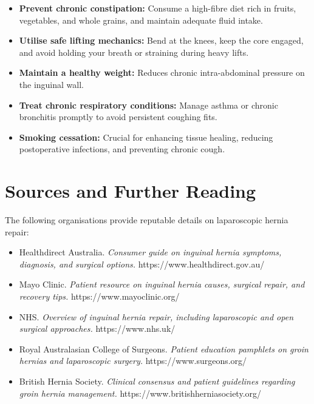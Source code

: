 \begin{itemize}
    \item \textbf{Prevent chronic constipation:} Consume a high-fibre diet rich in fruits, vegetables, and whole grains, and maintain adequate fluid intake.
    \item \textbf{Utilise safe lifting mechanics:} Bend at the knees, keep the core engaged, and avoid holding your breath or straining during heavy lifts.
    \item \textbf{Maintain a healthy weight:} Reduces chronic intra-abdominal pressure on the inguinal wall.
    \item \textbf{Treat chronic respiratory conditions:} Manage asthma or chronic bronchitis promptly to avoid persistent coughing fits.
    \item \textbf{Smoking cessation:} Crucial for enhancing tissue healing, reducing postoperative infections, and preventing chronic cough.
\end{itemize}

\section*{Sources and Further Reading}
The following organisations provide reputable details on laparoscopic hernia repair:

\begin{itemize}
    \item Healthdirect Australia. \textit{Consumer guide on inguinal hernia symptoms, diagnosis, and surgical options.} https://www.healthdirect.gov.au/
    \item Mayo Clinic. \textit{Patient resource on inguinal hernia causes, surgical repair, and recovery tips.} https://www.mayoclinic.org/
    \item NHS. \textit{Overview of inguinal hernia repair, including laparoscopic and open surgical approaches.} https://www.nhs.uk/
    \item Royal Australasian College of Surgeons. \textit{Patient education pamphlets on groin hernias and laparoscopic surgery.} https://www.surgeons.org/
    \item British Hernia Society. \textit{Clinical consensus and patient guidelines regarding groin hernia management.} https://www.britishherniasociety.org/
\end{itemize}
